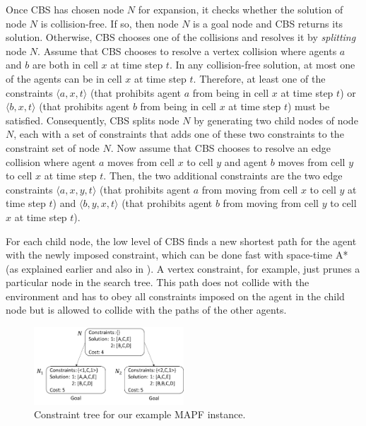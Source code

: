 \documentclass[11pt]{article}
\begin{document}
Once CBS has chosen node $N$ for expansion, it checks whether the solution of node $N$ is collision-free. If so, then node $N$ is a goal node and CBS returns its solution. Otherwise, CBS chooses one of the collisions and resolves it by {\em splitting} node $N$. Assume that CBS chooses to resolve a vertex collision where agents $a$ and $b$ are both in cell $x$ at time step $t$. In any collision-free solution, at most one of the agents can be in cell $x$ at time step $t$. Therefore, at least one of the constraints $\langle a,x,t \rangle$ (that prohibits agent $a$ from being in cell $x$ at time step $t$) or $\langle b,x,t \rangle$ (that prohibits agent $b$ from being in cell $x$ at time step $t$) must be satisfied. Consequently, CBS splits node $N$ by generating two child nodes of node $N$, each with a set of constraints that adds one of these two constraints to the constraint set of node $N$. Now assume that CBS chooses to resolve an edge collision where agent $a$ moves from cell $x$ to cell $y$ and agent $b$ moves from cell $y$ to cell $x$ at time step $t$. Then, the two additional constraints are the two edge constraints $\langle a,x,y,t \rangle$ (that prohibits agent $a$ from moving from cell $x$ to cell $y$ at time step $t$) and $\langle b,y,x,t \rangle$ (that prohibits agent $b$ from moving from cell $y$ to cell $x$ at time step $t$). 

For each child node, the low level of CBS finds a new shortest path for the agent with the newly imposed constraint, which can be done fast with space-time A* (as explained earlier and also in \cite{Feln15}). A vertex constraint, for example, just prunes a particular node in the search tree. This path does not collide with the environment and has to obey all constraints imposed on the agent in the child node but is allowed to collide with the paths of the other agents. 

\begin{figure}[ht]
\centering
\includegraphics[width=0.5\textwidth]{images/CT.png}
\caption{Constraint tree for our example MAPF instance. \label{ct}}
\end{figure}
\end{document}
